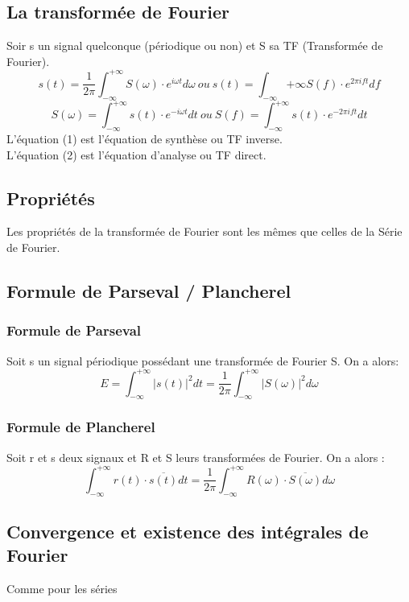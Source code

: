\documentclass[10pt,a4paper,twoside]{article}
\begin{document}
\subsection{La transformée de Fourier}
Soir s un signal quelconque (périodique ou non) et S sa TF (Transformée de Fourier).
\begin{equation}
s(t)=\frac{1}{2\pi} \int_{-\infty}^{+\infty}S(\omega) \cdot e^{i\omega t} d\omega\ ou\ s(t)=\int_{-\infty}{+\infty}S(f)\cdot e^{2\pi ift}df
\end{equation}
\begin{equation}
S(\omega) = \int_{-\infty}^{+\infty}s(t)\cdot e^{-i\omega t}dt\ ou\ S(f) = \int_{-\infty}^{+\infty}s(t)\cdot e^{-2\pi ift}dt
\end{equation}
L'équation (1) est l'équation de synthèse ou TF inverse.\\
L'équation (2) est l'équation d'analyse ou TF direct.

\subsection{Propriétés}
Les propriétés de la transformée de Fourier sont les mêmes que celles de la Série de Fourier.

\subsection{Formule de Parseval / Plancherel}
\subsubsection{Formule de Parseval}
Soit s un signal périodique possédant une transformée de Fourier S. On a alors:
$$E=\int_{-\infty}^{+\infty}|s(t)|^{2}dt = \frac{1}{2\pi} \int_{-\infty}^{+\infty}|S(\omega)|^{2}d\omega$$
\subsubsection{Formule de Plancherel}
Soit r et s deux signaux et R et S leurs transformées de Fourier. On a alors :
$$\int_{-\infty}^{+\infty}r(t)\cdot \overline{s(t)} dt = \frac{1}{2\pi} \int_{-\infty}^{+\infty}R(\omega) \cdot \overline{S(\omega)} d\omega$$

\subsection{Convergence et existence des intégrales de Fourier}
Comme pour les séries
\end{document}
